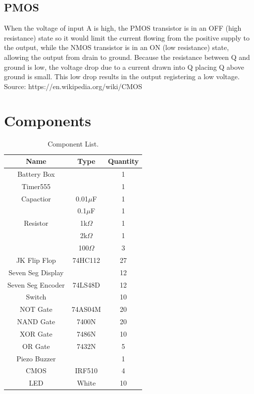\documentclass[12pt]{article}
\begin{document}
\subsection{PMOS}
When the voltage of input A is high, the PMOS transistor is in an OFF (high resistance) state so it would limit the current flowing from the positive supply to the output, while the NMOS transistor is in an ON (low resistance) state, allowing the output from drain to ground. Because the resistance between Q and ground is low, the voltage drop due to a current drawn into Q placing Q above ground is small. This low drop results in the output registering a low voltage.\\
Source: https://en.wikipedia.org/wiki/CMOS\\
\clearpage

\section{Components}
\begin{table}[!h]
\centering
\caption{Component List.}
\begin{tabular}{ccc}
\toprule
Name & Type  & Quantity \\
\midrule
 Battery Box  &    & 1  \\
 Timer555 &   & 1 \\
 Capactior  & 0.01$\mu$F   & 1  \\
     & 0.1$\mu$F  & 1 \\
Resistor & 1k$\Omega$  & 1 \\
     &  2k$\Omega$ & 1 \\
     &  100$\Omega$ & 3 \\
JK Flip Flop   & 74HC112  & 27 \\
Seven Seg Display  &    & 12  \\
Seven Seg Encoder&  74LS48D  & 12  \\
Switch  &    & 10  \\
NOT Gate  & 74AS04M & 20  \\
NAND Gate  & 7400N & 20  \\
XOR Gate  & 7486N & 10  \\
OR Gate  & 7432N & 5  \\
Piezo Buzzer & & 1  \\
CMOS & IRF510 & 4  \\
LED & White & 10  \\
\bottomrule
\end{tabular}
\end{table}
\end{document}
